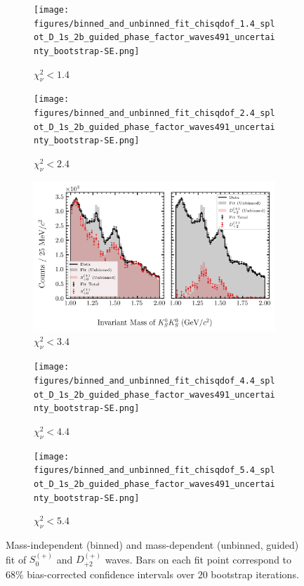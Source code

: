 \begin{figure}[htbp]
    \centering
    \begin{subfigure}{0.45\textwidth}
        \texttt{[image: figures/binned\_and\_unbinned\_fit\_chisqdof\_1.4\_splot\_D\_1s\_2b\_guided\_phase\_factor\_waves491\_uncertainty\_bootstrap-SE.png]}
        \caption{$\chi^2_\nu < 1.4$}
    \end{subfigure}
    \hfill
    \begin{subfigure}{0.45\textwidth}
        \texttt{[image: figures/binned\_and\_unbinned\_fit\_chisqdof\_2.4\_splot\_D\_1s\_2b\_guided\_phase\_factor\_waves491\_uncertainty\_bootstrap-SE.png]}
        \caption{$\chi^2_\nu < 2.4$}
    \end{subfigure}

    \vspace{1em}

    \begin{subfigure}{0.8\textwidth}
        \includegraphics[width=\linewidth]{figures/binned_and_unbinned_fit_chisqdof_3.4_splot_D_1s_2b_guided_phase_factor_waves491_uncertainty_bootstrap-SE.png}
        \caption{$\chi^2_\nu < 3.4$}
    \end{subfigure}

    \vspace{1em}

    \begin{subfigure}{0.45\textwidth}
        \texttt{[image: figures/binned\_and\_unbinned\_fit\_chisqdof\_4.4\_splot\_D\_1s\_2b\_guided\_phase\_factor\_waves491\_uncertainty\_bootstrap-SE.png]}
        \caption{$\chi^2_\nu < 4.4$}
    \end{subfigure}
    \hfill
    \begin{subfigure}{0.45\textwidth}
        \texttt{[image: figures/binned\_and\_unbinned\_fit\_chisqdof\_5.4\_splot\_D\_1s\_2b\_guided\_phase\_factor\_waves491\_uncertainty\_bootstrap-SE.png]}
        \caption{$\chi^2_\nu < 5.4$}
    \end{subfigure}

    \caption{Mass-independent (binned) and mass-dependent (unbinned, guided) fit of $S_{0}^{(+)}$ and $D_{+2}^{(+)}$ waves. Bars on each fit point correspond to $68\%$ bias-corrected confidence intervals over $20$ bootstrap iterations.}
    \label{fig:unbinned-guided-fit-all-Sp-D2p}
\end{figure}


